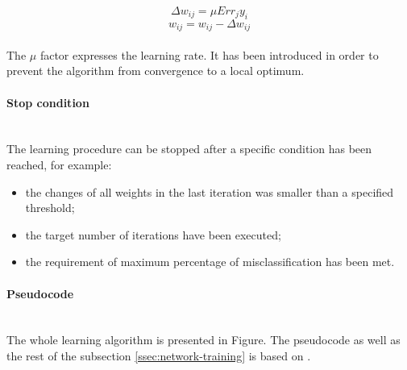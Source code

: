\documentclass[11pt,oneside, a4paper]{report}
\begin{document}
\begin{equation}
\Delta w_{ij} = \mu Err_j y_i
\end{equation}
\begin{equation}
w_{ij} = w_{ij} - \Delta w_{ij}
\end{equation}
\\
The $\mu$ factor expresses the learning rate. It has been introduced in order to prevent the algorithm from convergence to a local optimum.

\paragraph{Stop condition}\mbox{}\\
The learning procedure can be stopped after a specific condition has been reached, for example:
\begin{itemize}
	\item the changes of all weights in the last iteration was smaller than a specified threshold; 
	\item the target number of iterations have been executed;
	\item the requirement of maximum percentage of misclassification has been met.
\end{itemize}

\paragraph{Pseudocode}\mbox{}\\
The whole learning algorithm is presented in Figure. The pseudocode as well as the rest of the subsection \ref{ssec:network-training} is based on \cite{HAN2005}.



{}

\end{document}
